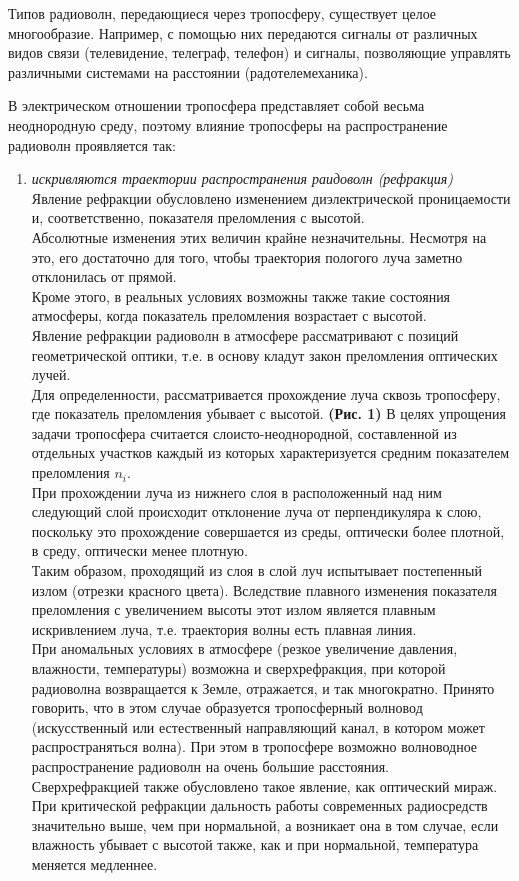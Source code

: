 \documentclass[a4paper,12pt]{article} %
\begin{document}
Типов радиоволн, передающиеся через тропосферу, существует целое многообразие. Например, с помощью них передаются сигналы от различных видов связи (телевидение, телеграф, телефон) и сигналы, позволяющие управлять различными системами на расстоянии (радотелемеханика). \

 В электрическом отношении тропосфера представляет собой весьма неоднородную среду, поэтому влияние тропосферы на распространение радиоволн проявляется так:

\begin{enumerate}

\item \textsl{искривляются траектории распространения раидоволн (рефракция)} \\
Явление рефракции обусловлено изменением диэлектрической проницаемости и, соответственно, показателя преломления с высотой. \\
Абсолютные изменения этих величин крайне незначительны. Несмотря на это, его достаточно для того, чтобы траектория пологого луча заметно отклонилась от прямой. \\
Кроме этого, в реальных условиях возможны также такие состояния атмосферы, когда показатель преломления возрастает с высотой. \\
Явление рефракции радиоволн в атмосфере рассматривают с позиций геометрической оптики, т.е. в основу кладут закон преломления оптических лучей. \\
Для определенности, рассматривается прохождение луча сквозь тропосферу, где показатель преломления убывает с высотой. \textbf{(Рис. 1)} В целях упрощения задачи тропосфера считается слоисто-неоднородной, составленной из отдельных участков каждый из которых характеризуется средним показателем преломления \(n_{i}\). \\
При прохождении луча из нижнего слоя в расположенный над ним следующий слой происходит отклонение луча от перпендикуляра к слою, поскольку это прохождение совершается из среды, оптически более плотной, в среду, оптически менее плотную. \\
Таким образом, проходящий из слоя в слой луч испытывает постепенный излом (отрезки красного цвета). Вследствие плавного изменения показателя преломления с увеличением высоты этот излом является плавным искривлением луча, т.е. траектория волны есть плавная линия. \\
При аномальных условиях в атмосфере (резкое увеличение давления, влажности, температуры) возможна и сверхрефракция, при которой радиоволна возвращается к Земле, отражается, и так многократно. Принято говорить, что в этом случае образуется тропосферный волновод (искусственный или естественный направляющий канал, в котором может распространяться волна). При этом в тропосфере возможно волноводное распространение радиоволн на очень большие расстояния.\\
Сверхрефракцией также обусловлено такое явление, как оптический мираж. \\
При критической рефракции дальность работы современных радиосредств значительно выше, чем при нормальной, а возникает она в том случае, если влажность
убывает с высотой также, как и при нормальной, температура меняется медленнее. 


\end{enumerate}
\end{document}
